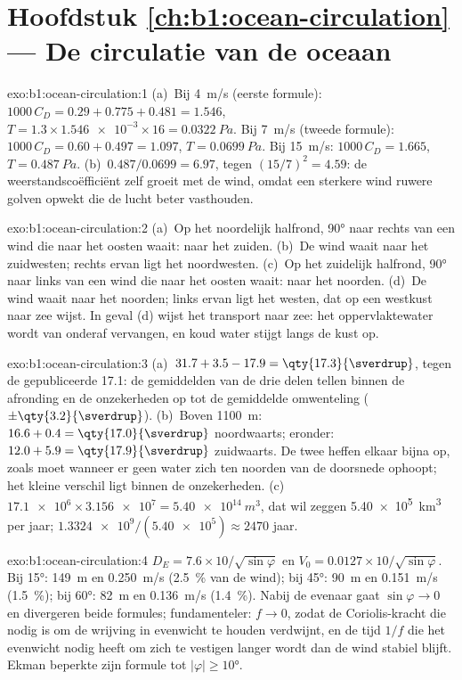 \section*{Hoofdstuk \ref{ch:b1:ocean-circulation} --- De circulatie van de oceaan}

\begin{solution}{exo:b1:ocean-circulation:1}
(a)~Bij \qty{4}{m/s} (eerste formule): $1000\,C_D = 0.29 + 0.775 + 0.481 = 1.546$,
$T = 1.3 \times \num{1.546e-3} \times 16 = \qty{0.0322}{Pa}$. Bij \qty{7}{m/s}
(tweede formule): $1000\,C_D = 0.60 + 0.497 = 1.097$, $T = \qty{0.0699}{Pa}$. Bij
\qty{15}{m/s}: $1000\,C_D = 1.665$, $T = \qty{0.487}{Pa}$. (b)~$0.487/0.0699 =
6.97$, tegen $(15/7)^2 = 4.59$: de weerstandscoëfficiënt zelf groeit met de wind,
omdat een sterkere wind ruwere golven opwekt die de lucht beter vasthouden.
\end{solution}

\begin{solution}{exo:b1:ocean-circulation:2}
(a)~Op het noordelijk halfrond, \ang{90} naar rechts van een wind die naar het oosten waait: naar het zuiden. (b)~De wind waait naar het zuidwesten; rechts ervan ligt het noordwesten. (c)~Op het zuidelijk halfrond, \ang{90} naar links van een wind die naar het oosten waait: naar het noorden. (d)~De wind waait naar het noorden; links ervan ligt het westen, dat op een westkust naar zee wijst. In geval (d) wijst het transport naar zee: het oppervlaktewater wordt van onderaf vervangen, en koud water stijgt langs de kust op.
\end{solution}

\begin{solution}{exo:b1:ocean-circulation:3}
(a)~$31.7 + 3.5 - 17.9 = \qty{17.3}{\sverdrup}$, tegen de gepubliceerde
\qty{17.1}{\sverdrup}: de gemiddelden van de drie delen tellen binnen de afronding en de onzekerheden op tot de gemiddelde omwenteling ($\pm\qty{3.2}{\sverdrup}$).
(b)~Boven \qty{1100}{m}: $16.6 + 0.4 = \qty{17.0}{\sverdrup}$ noordwaarts; eronder: $12.0 + 5.9 = \qty{17.9}{\sverdrup}$ zuidwaarts. De twee heffen elkaar bijna op, zoals moet wanneer er geen water zich ten noorden van de doorsnede ophoopt; het kleine verschil ligt binnen de onzekerheden. (c)~$\num{17.1e6} \times \num{3.156e7} = \qty{5.40e14}{m^3}$, dat wil zeggen
\qty{5.40e5}{km^3} per jaar; $\num{1.3324e9}/(\num{5.40e5}) \approx 2470$ jaar.
\end{solution}

\begin{solution}{exo:b1:ocean-circulation:4}
$D_E = 7.6 \times 10/\sqrt{\sin\varphi}$ en $V_0 = 0.0127 \times
10/\sqrt{\sin\varphi}$. Bij \ang{15}: \qty{149}{m} en \qty{0.250}{m/s}
(\qty{2.5}{\percent} van de wind); bij \ang{45}: \qty{90}{m} en \qty{0.151}{m/s}
(\qty{1.5}{\percent}); bij \ang{60}: \qty{82}{m} en \qty{0.136}{m/s}
(\qty{1.4}{\percent}). Nabij de evenaar gaat $\sin\varphi \to 0$ en divergeren beide formules; fundamenteler: $f \to 0$, zodat de Coriolis-kracht die nodig is om de wrijving in evenwicht te houden verdwijnt, en de tijd $1/f$ die het evenwicht nodig heeft om zich te vestigen langer wordt dan de wind stabiel blijft. Ekman beperkte zijn formule tot $|\varphi| \geq
\ang{10}$.
\end{solution}

